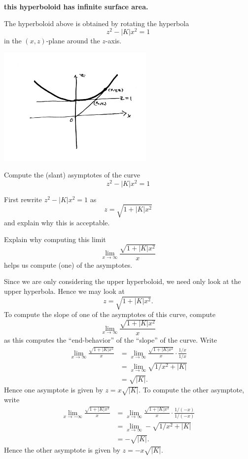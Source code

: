 \documentclass{ximera}
\begin{document}
\begin{center}
  \textbf{this hyperboloid has infinite surface area.}
\end{center}

The hyperboloid above is obtained by rotating the hyperbola
\[
z^{2}-\left\vert K\right\vert x^{2}= 1
\]
in the $(x,z)$-plane around the $z$-axis.
\begin{image}
\includegraphics[width=3in]{UpperHyperbola.png}
\end{image}


\begin{problem}
  Compute the (slant) asymptotes of the curve
  \[
  z^{2}-\left\vert K\right\vert x^{2}= 1
  \]
  \begin{hint}
    First rewrite $z^{2}-|K|x^{2} =1$ as
    \[
    z = \sqrt{1+|K|x^2}
    \]
    and explain why this is acceptable.
  \end{hint}
  \begin{hint}
    Explain why computing this limit
    \[
    \lim_{x\to \infty} \frac{\sqrt{1+|K|x^2}}{x}
    \]
    helps us compute (one) of the asymptotes.
  \end{hint}
  \begin{freeResponse}
    Since we are only considering the upper hyperboloid, we need only
    look at the upper hyperbola. Hence we may look at
     \[
    z = \sqrt{1+|K|x^2}.
    \]
    To compute the slope of one of the asymptotes of this curve,
    compute
    \[
    \lim_{x\to \infty} \frac{\sqrt{1+|K|x^2}}{x}
    \]
    as this computes the ``end-behavior'' of the ``slope'' of the
    curve. Write
    \begin{align*}
      \lim_{x\to \infty} \frac{\sqrt{1+|K|x^2}}{x} &= \lim_{x\to \infty} \frac{\sqrt{1+|K|x^2}}{x}\cdot \frac{1/x}{1/x}\\
      &= \lim_{x\to \infty} \sqrt{1/x^2+|K|}\\
      &= \sqrt{|K|}.
    \end{align*}
    Hence one asymptote is given by $z = x\sqrt{|K|}$. To compute the other asymptote, write
    \begin{align*}
      \lim_{x\to -\infty} \frac{\sqrt{1+|K|x^2}}{x} &= \lim_{x\to \infty} \frac{\sqrt{1+|K|x^2}}{x}\cdot \frac{1/(-x)}{1/(-x)}\\
      &= \lim_{x\to \infty} -\sqrt{1/x^2+|K|}\\
      &= -\sqrt{|K|}.
    \end{align*}
    Hence the other asymptote is given by $z = -x\sqrt{|K|}$.
  \end{freeResponse}
\end{problem}
\end{document}
